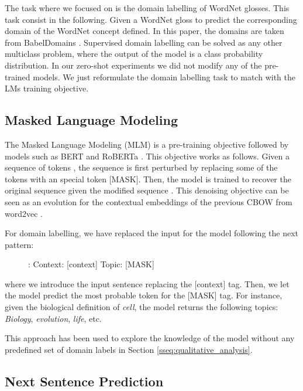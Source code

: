 \documentclass[11pt]{article}
\begin{document}
The task where we focused on is the domain labelling of WordNet glosses. This task consist in the following. Given a WordNet gloss  to predict the corresponding domain  of the WordNet concept defined. In this paper, the domains are taken from BabelDomains \cite{camacho2017}. Supervised domain labelling can be solved as any other multiclass problem, where the output of the model is a class probability distribution. In our zero-shot experiments we did not modify any of the pre-trained models. We just reformulate the domain labelling task to match with the LMs training objective.



\subsection{Masked Language Modeling}
\label{masked-language-model}

The Masked Language Modeling (MLM) is a pre-training objective followed by models such as BERT \cite{bert} and RoBERTa \cite{ROBERTA}. This objective works as follows. Given a sequence of tokens , the sequence is first perturbed by replacing some of the tokens  with an special token [MASK]. Then, the model is trained to recover the original sequence  given the modified sequence . This denoising objective can be seen as an evolution for the contextual embeddings of the previous CBOW from word2vec \cite{cbow}.

For domain labelling, we have replaced the input for the model following the next pattern:

\begin{figure}[!ht]
    \centering
    \begin{displayquote}
        : Context: [context] Topic: [MASK]
    \end{displayquote}
    \label{fig:mlm_example}
\end{figure}

\noindent where we introduce the input sentence replacing the [context] tag. Then, we let the model predict the most probable token for the [MASK] tag. For instance, given the biological definition of {\it cell}, the model returns the following topics: {\it Biology}, {\it evolution}, {\it life}, etc.

This approach has been used to explore the knowledge of the model without any predefined set of domain labels in Section \ref{sseq:qualitative_analysis}.



\subsection{Next Sentence Prediction}
\end{document}
